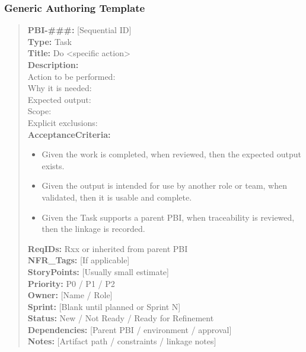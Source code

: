 \documentclass[11pt,a4paper]{article}
\begin{document}
\subsubsection*{Generic Authoring Template}
\begin{quote}
\textbf{PBI-\#\#\#:} [Sequential ID] \\
\textbf{Type:} Task \\
\textbf{Title:} Do \textless specific action\textgreater \\

\textbf{Description:} \\
Action to be performed: \\
Why it is needed: \\
Expected output: \\
Scope: \\
Explicit exclusions: \\

\textbf{AcceptanceCriteria:}
\begin{itemize}[leftmargin=1.5em]
    \item Given the work is completed, when reviewed, then the expected output exists.
    \item Given the output is intended for use by another role or team, when validated, then it is usable and complete.
    \item Given the Task supports a parent PBI, when traceability is reviewed, then the linkage is recorded.
\end{itemize}

\textbf{ReqIDs:} Rxx or inherited from parent PBI \\
\textbf{NFR\_Tags:} [If applicable] \\
\textbf{StoryPoints:} [Usually small estimate] \\
\textbf{Priority:} P0 / P1 / P2 \\
\textbf{Owner:} [Name / Role] \\
\textbf{Sprint:} [Blank until planned or Sprint N] \\
\textbf{Status:} New / Not Ready / Ready for Refinement \\
\textbf{Dependencies:} [Parent PBI / environment / approval] \\
\textbf{Notes:} [Artifact path / constraints / linkage notes]
\end{quote}
\end{document}

